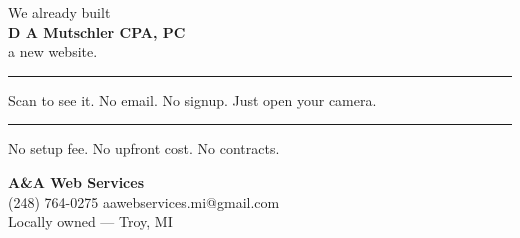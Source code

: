 \documentclass[11pt,letterpaper]{article}
\begin{document}
\begin{center}

\newcommand{\businessname}{D A Mutschler CPA, PC}

\vspace*{0.1in}

{\fontsize{18}{22}\selectfont We already built}\\[0.1in]
{\fontsize{44}{48}\selectfont\bfseries \businessname}\\[0.1in]
{\fontsize{18}{22}\selectfont a new website.}

\vspace{0.3in}
\noindent\rule{\linewidth}{0.8pt}
\vspace{0.3in}

{\fontsize{15}{19}\selectfont Scan to see it. No email. No signup. Just open your camera.}

\vspace{0.35in}


\vspace{0.35in}
\noindent\rule{\linewidth}{0.8pt}
\vspace{0.3in}

{\fontsize{14}{18}\selectfont No setup fee. No upfront cost. No contracts.}

\vspace{0.3in}

{\fontsize{20}{24}\selectfont\bfseries A\&A Web Services}\\[0.15in]
{\fontsize{15}{19}\selectfont (248) 764-0275 \quad aawebservices.mi@gmail.com}\\[0.1in]
{\fontsize{12}{16}\selectfont Locally owned --- Troy, MI}

\vspace*{\fill}

\end{center}
\hfill{\color{gray!70}\fontsize{5}{6}}
\end{document}
